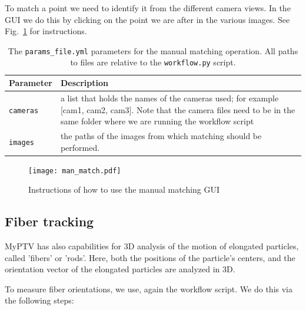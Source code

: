 \documentclass[10pt,a4paper]{article}
\begin{document}
To match a point we need to identify it from the different camera views. In the GUI we do this by clicking on the point we are after in the various images. See Fig.~\ref{fig:man_match} for instructions.

%
\begin{table}[!ht]
	\centering
	\caption{The \texttt{params\_file.yml} parameters for the manual matching operation. All paths to files are relative to the \texttt{workflow.py} script. \label{tab:man_match}}
	\begin{tabular}{l m{12cm}}
		\hline
		Parameter & Description\\[.2cm]
		\hline
		\texttt{cameras} & a list that holds the names of the cameras used; for example [cam1, cam2, cam3]. Note that the camera files need to be in the same folder where we are running the workflow script\\[.2cm]
		\texttt{images} & the paths of the images from which matching should be performed. \\[.2cm]
		\hline
	\end{tabular}
\end{table}



\begin{figure}
	\centering
	\texttt{[image: man\_match.pdf]}
	\caption{Instructions of how to use the manual matching GUI \label{fig:man_match}}
\end{figure}








\subsection{Fiber tracking} \label{sec:fibers}

MyPTV has also capabilities for 3D analysis of the motion of elongated particles, called 'fibers' or 'rods'. Here, both the positions of the particle's centers, and the orientation vector of the elongated particles are analyzed in 3D. 

To measure fiber orientations, we use, again the workflow script. We do this via the following steps:
\end{document}
